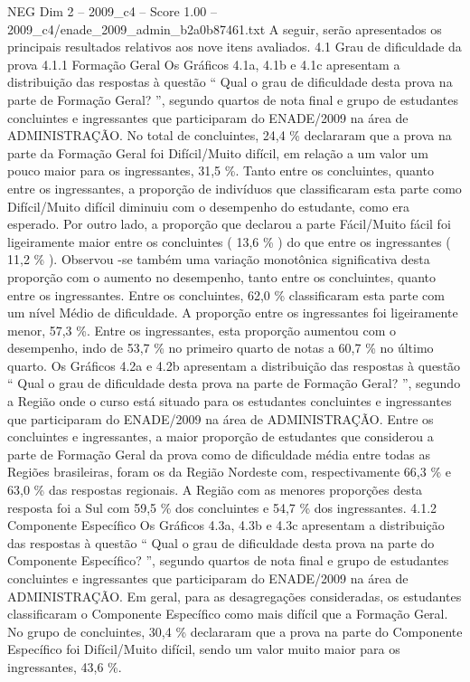 \begin{textsample}{NEG Dim 2 – 2009\_c4 – Score 1.00 – 2009\_c4/enade\_2009\_admin\_b2a0b87461.txt}
A seguir, serão apresentados os principais resultados relativos aos nove itens avaliados. 4.1 Grau de dificuldade da prova 4.1.1 Formação Geral Os Gráficos 4.1a, 4.1b e 4.1c apresentam a distribuição das respostas à questão “ Qual o grau de dificuldade desta prova na parte de Formação Geral? ”, segundo quartos de nota final e grupo de estudantes concluintes e ingressantes que participaram do ENADE/2009 na área de ADMINISTRAÇÃO.
No total de concluintes, 24,4 \% declararam que a prova na parte da Formação Geral foi Difícil/Muito difícil, em relação a um valor um pouco maior para os ingressantes, 31,5 \%.
Tanto entre os concluintes, quanto entre os ingressantes, a proporção de indivíduos que classificaram esta parte como Difícil/Muito difícil diminuiu com o desempenho do estudante, como era esperado.
Por outro lado, a proporção que declarou a parte Fácil/Muito fácil foi ligeiramente maior entre os concluintes ( 13,6 \% ) do que entre os ingressantes ( 11,2 \% ).
Observou -se também uma variação monotônica significativa desta proporção com o aumento no desempenho, tanto entre os concluintes, quanto entre os ingressantes.
Entre os concluintes, 62,0 \% classificaram esta parte com um nível Médio de dificuldade.
A proporção entre os ingressantes foi ligeiramente menor, 57,3 \%.
Entre os ingressantes, esta proporção aumentou com o desempenho, indo de 53,7 \% no primeiro quarto de notas a 60,7 \% no último quarto.
Os Gráficos 4.2a e 4.2b apresentam a distribuição das respostas à questão “ Qual o grau de dificuldade desta prova na parte de Formação Geral? ”, segundo a Região onde o curso está situado para os estudantes concluintes e ingressantes que participaram do ENADE/2009 na área de ADMINISTRAÇÃO.
Entre os concluintes e ingressantes, a maior proporção de estudantes que considerou a parte de Formação Geral da prova como de dificuldade média entre todas as Regiões brasileiras, foram os da Região Nordeste com, respectivamente 66,3 \% e 63,0 \% das respostas regionais.
A Região com as menores proporções desta resposta foi a Sul com 59,5 \% dos concluintes e 54,7 \% dos ingressantes. 4.1.2 Componente Específico Os Gráficos 4.3a, 4.3b e 4.3c apresentam a distribuição das respostas à questão “ Qual o grau de dificuldade desta prova na parte do Componente Específico? ”, segundo quartos de nota final e grupo de estudantes concluintes e ingressantes que participaram do ENADE/2009 na área de ADMINISTRAÇÃO.
Em geral, para as desagregações consideradas, os estudantes classificaram o Componente Específico como mais difícil que a Formação Geral.
No grupo de concluintes, 30,4 \% declararam que a prova na parte do Componente Específico foi Difícil/Muito difícil, sendo um valor muito maior para os ingressantes, 43,6 \%.

\end{textsample}
